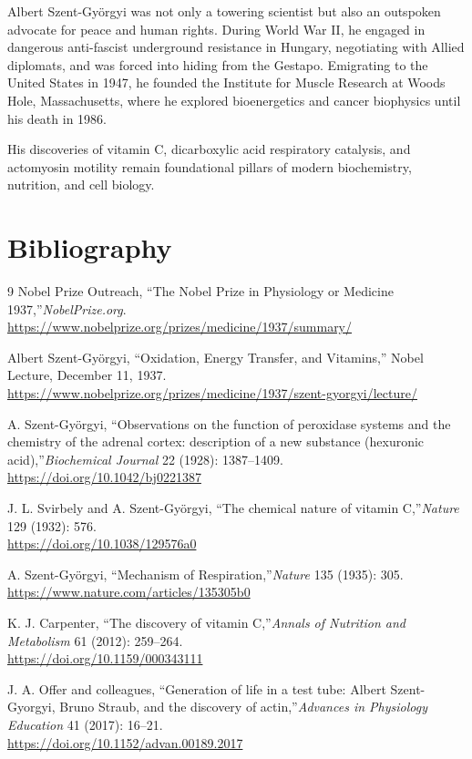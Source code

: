 Albert Szent-Györgyi was not only a towering scientist but also an outspoken advocate for peace and human rights. During World War II, he engaged in dangerous anti-fascist underground resistance in Hungary, negotiating with Allied diplomats, and was forced into hiding from the Gestapo. Emigrating to the United States in 1947, he founded the Institute for Muscle Research at Woods Hole, Massachusetts, where he explored bioenergetics and cancer biophysics until his death in 1986. 

His discoveries of vitamin C, dicarboxylic acid respiratory catalysis, and actomyosin motility remain foundational pillars of modern biochemistry, nutrition, and cell biology.

\section{Bibliography}

\begin{thebibliography}{9}
Nobel Prize Outreach, ``The Nobel Prize in Physiology or Medicine 1937,''\emph{NobelPrize.org}.\\
\url{https://www.nobelprize.org/prizes/medicine/1937/summary/}

Albert Szent-Gy\"orgyi, ``Oxidation, Energy Transfer, and Vitamins,'' Nobel Lecture, December 11, 1937.\\
\url{https://www.nobelprize.org/prizes/medicine/1937/szent-gyorgyi/lecture/}

A. Szent-Gy\"orgyi, ``Observations on the function of peroxidase systems and the chemistry of the adrenal cortex: description of a new substance (hexuronic acid),''\emph{Biochemical Journal} 22 (1928): 1387--1409.\\
\url{https://doi.org/10.1042/bj0221387}

J. L. Svirbely and A. Szent-Gy\"orgyi, ``The chemical nature of vitamin C,''\emph{Nature} 129 (1932): 576.\\
\url{https://doi.org/10.1038/129576a0}

A. Szent-Gy\"orgyi, ``Mechanism of Respiration,''\emph{Nature} 135 (1935): 305.\\
\url{https://www.nature.com/articles/135305b0}

K. J. Carpenter, ``The discovery of vitamin C,''\emph{Annals of Nutrition and Metabolism} 61 (2012): 259--264.\\
\url{https://doi.org/10.1159/000343111}

J. A. Offer and colleagues, ``Generation of life in a test tube: Albert Szent-Gyorgyi, Bruno Straub, and the discovery of actin,''\emph{Advances in Physiology Education} 41 (2017): 16--21.\\
\url{https://doi.org/10.1152/advan.00189.2017}
\end{thebibliography}
